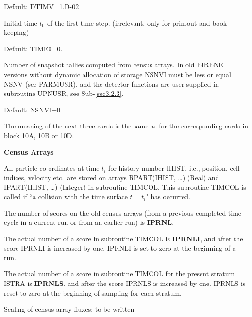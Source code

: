 \begin{description}
        Default: DTIMV=1.D-02 

  \item[TIME0] Initial time $t_0$ of the first time-step.
        (irrelevant, only for printout and book-keeping) 

        Default: TIME0=0.

  \item[NSNVI] Number of snapshot tallies computed from census arrays.
        In old EIRENE versions without dynamic allocation of storage NSNVI must be less or equal NSNV (see PARMUSR), and the detector functions are user supplied in subroutine UPNUSR, see Sub-\cref{sec3.2.3}.

        Default: NSNVI=0 

\end{description}
The meaning of the next three cards is the same as for the corresponding cards in block 10A, 10B or 10D.

\bigskip
\textbf{Census Arrays}

All particle co-ordinates at time $t_i$ for history number IHIST, i.e., position, cell indices, velocity etc.\ are stored on arrays RPART(IHIST, \dots) (Real) and IPART(IHIST, \dots) (Integer) in subroutine TIMCOL.
This subroutine TIMCOL is called if ``a collision with the time surface $t=t_i$" has occurred.

The number of scores on the old census arrays (from a previous completed time-cycle in a current run or from an earlier run) is \textbf{IPRNL}.

The actual number of a score in subroutine TIMCOL is \textbf{IPRNLI}, and after the score IPRNLI is increased by one.
IPRNLI is set to zero at the beginning of a run.

The actual number of a score in subroutine TIMCOL for the present stratum ISTRA  is \textbf{IPRNLS}, and after the score IPRNLS is increased by one.
IPRNLS is reset to zero at the beginning of sampling for each stratum.

Scaling of census array fluxes:   to be written
